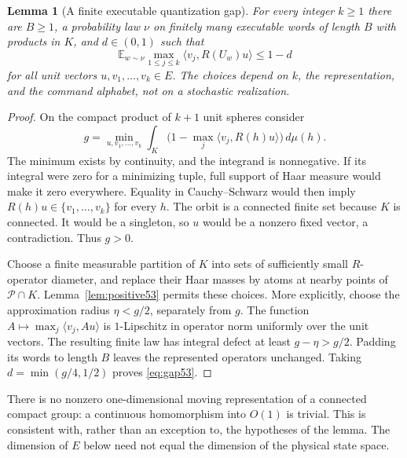 \documentclass[11pt]{amsart}
\numberwithin{equation}{section}
\newtheorem{lemma}[theorem]{Lemma}
\theoremstyle{definition}
\theoremstyle{remark}
\newcommand{\E}{\mathbb E}
\newcommand{\ip}[2]{\langle #1,#2\rangle}
\begin{document}
\begin{lemma}[A finite executable quantization gap]\label{lem:gap53}
For every integer $k\ge1$ there are $B\ge1$, a probability law $\nu$ on finitely many executable words of length $B$ with products in $K$, and $d\in(0,1)$ such that
\begin{equation}\label{eq:gap53}
 \E_{w\sim\nu}\max_{1\le j\le k}\ip{v_j}{R(U_w)u}\le1-d
\end{equation}
for all unit vectors $u,v_1,\ldots,v_k\in E$. The choices depend on $k$, the representation, and the command alphabet, not on a stochastic realization.
\end{lemma}
\begin{proof}
On the compact product of $k+1$ unit spheres consider
\[
 g=\min_{u,v_1,\ldots,v_k}
 \int_K\bigl(1-\max_j\ip{v_j}{R(h)u}\bigr)\,d\mu(h).
\]
The minimum exists by continuity, and the integrand is nonnegative. If its integral were zero for a minimizing tuple, full support of Haar measure would make it zero everywhere. Equality in Cauchy--Schwarz would then imply $R(h)u\in\{v_1,\ldots,v_k\}$ for every $h$. The orbit is a connected finite set because $K$ is connected. It would be a singleton, so $u$ would be a nonzero fixed vector, a contradiction. Thus $g>0$.

Choose a finite measurable partition of $K$ into sets of sufficiently small $R$-operator diameter, and replace their Haar masses by atoms at nearby points of $\mathcal P\cap K$. Lemma~\ref{lem:positive53} permits these choices. More explicitly, choose the approximation radius $\eta<g/2$, separately from $g$. The function $A\mapsto\max_j\ip{v_j}{Au}$ is $1$-Lipschitz in operator norm uniformly over the unit vectors. The resulting finite law has integral defect at least $g-\eta>g/2$. Padding its words to length $B$ leaves the represented operators unchanged. Taking $d=\min(g/4,1/2)$ proves \eqref{eq:gap53}.
\end{proof}
There is no nonzero one-dimensional moving representation of a connected compact group: a continuous homomorphism into $O(1)$ is trivial. This is consistent with, rather than an exception to, the hypotheses of the lemma. The dimension of $E$ below need not equal the dimension of the physical state space.
\end{document}
